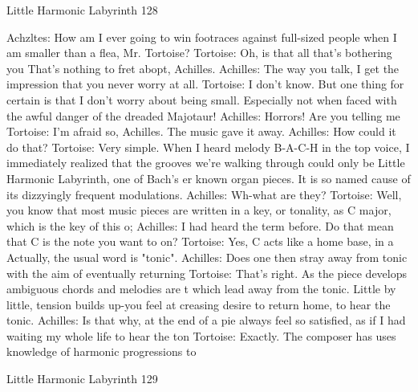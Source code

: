 Little Harmonic Labyrinth                                                          128

               Achzltes: How am I ever going to win footraces against full-sized people
                      when I am smaller than a flea, Mr. Tortoise?
               Tortoise: Oh, is that all that's bothering you That's nothing to fret abopt,
                      Achilles.
               Achilles: The way you talk, I get the impression that you never worry at
                      all.
               Tortoise: I don't know. But one thing for certain is that I don't worry
                      about being small. Especially not when faced with the awful
                      danger of the dreaded Majotaur!
               Achilles: Horrors! Are you telling me
               Tortoise: I'm afraid so, Achilles. The music gave it away.
               Achilles: How could it do that?
               Tortoise: Very simple. When I heard melody B-A-C-H in the top voice,
                      I immediately realized that the grooves we're walking through
                      could only be Little Harmonic Labyrinth, one of Bach's er known
                      organ pieces. It is so named cause of its dizzyingly frequent
                      modulations.
               Achilles: Wh-what are they?
               Tortoise: Well, you know that most music pieces are written in a key, or
                      tonality, as C major, which is the key of this o;
               Achilles: I had heard the term before. Do that mean that C is the note
                      you want to on?
               Tortoise: Yes, C acts like a home base, in a Actually, the usual word is
                      "tonic".
               Achilles: Does one then stray away from tonic with the aim of eventually
                      returning
               Tortoise: That's right. As the piece develops ambiguous chords and
                      melodies are t which lead away from the tonic. Little by little,
                      tension builds up-you feel at creasing desire to return home, to
                      hear the tonic.
               Achilles: Is that why, at the end of a pie always feel so satisfied, as if I
                      had waiting my whole life to hear the ton
               Tortoise: Exactly. The composer has uses knowledge of harmonic
                      progressions to




Little Harmonic Labyrinth                                                              129

